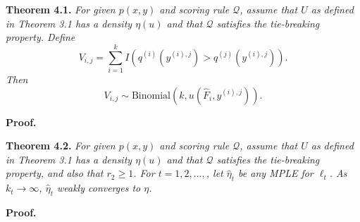 \documentclass[12pt]{article}
\begin{document}
\noindent\textbf{Theorem 4.1.}\emph{
For given $p(x, y)$ and scoring rule $\mathcal{Q}$, assume that $U$ as defined in Theorem 3.1 has a density $\eta(u)$
and that $\mathcal{Q}$ satisfies the tie-breaking property.
Define
\[
V_{i, j} = \sum_{i=1}^k I(q^{(i)}(y^{(i), j}) > q^{(j)}(y^{(i), j})).
\]
Then
\[
V_{i, j} \sim \text{Binomial}(k, u(\hat{F}_i, y^{(i), j})).
\]}

\noindent\textbf{Proof.}\newline

\noindent\textbf{Theorem 4.2.}
\emph{
For given $p(x, y)$ and scoring rule $\mathcal{Q}$, assume that $U$ as defined in Theorem 3.1 has a density $\eta(u)$
and that $\mathcal{Q}$ satisfies the tie-breaking property, and also that $r_2 \geq 1$.
For $t = 1, 2, \hdots, $, let $\hat{\eta}_t$ be any MPLE for $\ell_t$.
As $k_t \to \infty$, $\hat{\eta}_t$ weakly converges to $\eta$.}

\noindent\textbf{Proof.}\newline
\end{document}

